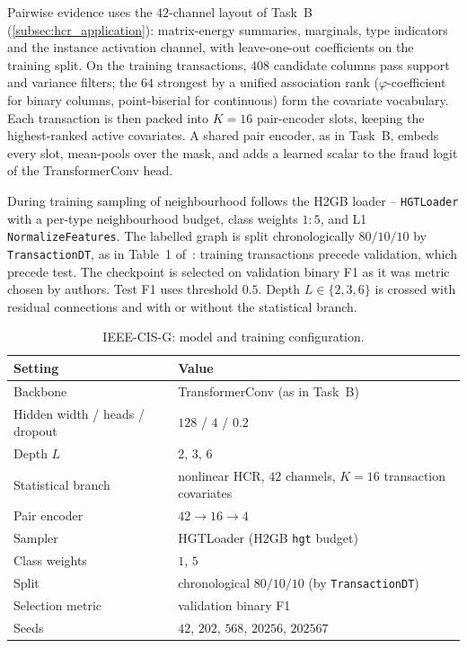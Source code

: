Pairwise evidence uses the $42$-channel layout of Task~B
(\cref{subsec:hcr_application}): matrix-energy summaries, marginals, type
indicators and the instance activation channel, with leave-one-out coefficients
on the training split.
On the training transactions, $408$ candidate columns pass support and variance
filters; the $64$ strongest by a unified association rank
($\varphi$-coefficient for binary columns, point-biserial for continuous)
form the covariate vocabulary.
Each transaction is then packed into $K=16$ pair-encoder slots, keeping the
highest-ranked active covariates.
A shared pair encoder, as in Task~B, embeds every slot,
mean-pools over the mask, and adds a learned scalar to the fraud logit of the
TransformerConv head.

During training sampling of neighbourhood follows the H2GB loader -- \texttt{HGTLoader} with a
per-type neighbourhood budget, class weights $1{:}5$, and L1
\texttt{NormalizeFeatures}.
The labelled graph is split chronologically $80/10/10$ by \texttt{TransactionDT},
as in Table~1 of~\cite{lin2025h2gb}: training transactions precede validation,
which precede test.
The checkpoint is selected on validation binary F1 as it was metric chosen by authors. 
Test F1 uses threshold $0.5$.
Depth $L\in\{2,3,6\}$ is crossed with residual connections and with or without
the statistical branch.

\begin{table}[H]
  \centering
  \small
  \caption{IEEE-CIS-G: model and training configuration.}
  \label{tab:ieee-cis-config}
  \begin{tabular}{ll}
    \toprule
    Setting & Value \\
    \midrule
    Backbone & TransformerConv (as in Task~B) \\
    Hidden width / heads / dropout & $128$ / $4$ / $0.2$ \\
    Depth $L$ & $2$, $3$, $6$ \\
    Statistical branch & nonlinear HCR, $42$ channels, $K=16$ transaction covariates \\
    Pair encoder & $42 \rightarrow 16 \rightarrow 4$ \\
    Sampler & HGTLoader (H2GB \texttt{hgt} budget) \\
    Class weights & $1$, $5$ \\
    Split & chronological $80/10/10$ (by \texttt{TransactionDT}) \\
    Selection metric & validation binary F1 \\
    Seeds & $42$, $202$, $568$, $20256$, $202567$ \\
    \bottomrule
  \end{tabular}
\end{table}

